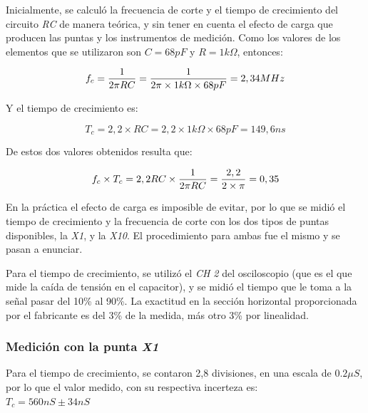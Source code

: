 \documentclass{article}
\begin{document}
	Inicialmente, se calculó la frecuencia de corte y el tiempo de crecimiento del circuito \textit{RC} de manera teórica, y sin tener en cuenta el efecto de carga que producen las puntas y los instrumentos de medición. Como los valores de los elementos que se utilizaron son \textbf{$C = 68pF$} y \textbf{$R = 1k\Omega $}, entonces:
\medskip

\begin{equation*}
	f_c = {1 \over 2 \pi RC} = {1 \over 2 \pi \times 1k\Omega \times 68pF} = 2,34 MHz
\end{equation*}
\medskip

Y el tiempo de crecimiento es:
\medskip

\begin{equation*}
	T_c = 2,2 \times RC = 2,2 \times 1k\Omega \times 68pF = 149,6 ns
\end{equation*}
\medskip

De estos dos valores obtenidos resulta que:
\medskip

\begin{equation*}
	f_c \times T_c = 2,2 RC \times {1 \over 2 \pi RC} = {2,2 \over 2 \times \pi} = 0,35
\end{equation*}
\medskip


	En la práctica el efecto de carga es imposible de evitar, por lo que se midió el tiempo de crecimiento y la frecuencia de corte con los dos tipos de puntas disponibles, la \textit{X1}, y la \textit{X10}. El procedimiento para ambas fue el mismo y se pasan a enunciar.
	\par
	Para el tiempo de crecimiento, se utilizó el \textit{CH 2} del osciloscopio (que es el que mide la caída de tensión en el capacitor), y se midió el tiempo que le toma a la señal pasar del 10\% al 90\%. La exactitud en la sección horizontal proporcionada por el fabricante es del 3\% de la medida, más otro 3\% por linealidad.
\bigskip



\subsubsection{Medición con la punta \textit{X1}}
	
	Para el tiempo de crecimiento, se contaron 2,8 divisiones, en una escala de $0.2 \mu S$, por lo que el valor medido, con su respectiva incerteza es: \\

$T_c = 560 nS \pm 34 nS$\\
\smallskip
\end{document}

